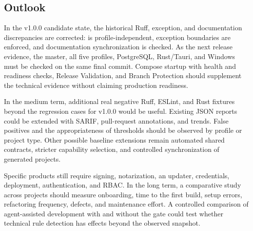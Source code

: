 \subsection{Outlook}
\label{subsec:ausblick}

In the v1.0.0 candidate state, the historical Ruff, exception, and documentation
discrepancies are corrected:  is profile-independent,
exception boundaries are enforced, and documentation synchronization is
checked. As the next release evidence, the master, all five profiles,
PostgreSQL, Rust/Tauri, and Windows must be checked on the same final commit.
Compose startup with health and readiness checks, Release
Validation, and Branch Protection should supplement the technical evidence
without claiming production readiness.

In the medium term, additional real negative Ruff, ESLint, and Rust fixtures
beyond the regression cases for v1.0.0 would be useful. Existing JSON reports
could be extended with SARIF, pull-request annotations, and trends. False
positives and the appropriateness of thresholds should be observed by profile
or project type. Other possible baseline extensions remain automated shared
contracts, stricter capability selection, and controlled synchronization of
generated projects.

Specific products still require signing, notarization, an updater, credentials,
deployment, authentication, and RBAC. In the long term, a comparative study
across projects should measure onboarding, time to the first build, setup
errors, refactoring frequency, defects, and maintenance effort. A controlled
comparison of agent-assisted development with and without the gate could test
whether technical rule detection has effects beyond the observed snapshot.

